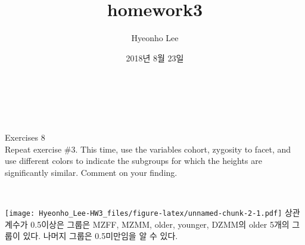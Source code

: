 \documentclass[]{article}
\title{homework3}
\author{Hyeonho Lee}
\date{2018년 8월 23일}
\newenvironment{Shaded}{\begin{snugshade}}{\end{snugshade}}
\newcommand{\KeywordTok}[1]{\textcolor[rgb]{0.13,0.29,0.53}{\textbf{#1}}}
\newcommand{\DataTypeTok}[1]{\textcolor[rgb]{0.13,0.29,0.53}{#1}}
\newcommand{\StringTok}[1]{\textcolor[rgb]{0.31,0.60,0.02}{#1}}
\newcommand{\OperatorTok}[1]{\textcolor[rgb]{0.81,0.36,0.00}{\textbf{#1}}}
\newcommand{\NormalTok}[1]{#1}
\begin{document}
\maketitle

\section{~}\label{section}

Exercises 8\\
Repeat exercise \#3. This time, use the variables cohort, zygosity to
facet, and use different colors to indicate the subgroups for which the
heights are significantly similar. Comment on your finding.

~

\begin{Shaded}
\end{Shaded}

\texttt{[image: Hyeonho\_Lee-HW3\_files/figure-latex/unnamed-chunk-2-1.pdf]}
상관계수가 0.5이상은 그룹은 MZFF, MZMM, older, younger, DZMM의 older
5개의 그룹이 있다. 나머지 그룹은 0.5미만임을 알 수 있다.
\end{document}
